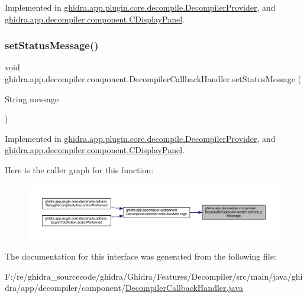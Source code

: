Implemented in \mbox{\hyperlink{classghidra_1_1app_1_1plugin_1_1core_1_1decompile_1_1_decompiler_provider_af5b6c269879799df67d4594c6df80434}{ghidra.\+app.\+plugin.\+core.\+decompile.\+Decompiler\+Provider}}, and \mbox{\hyperlink{classghidra_1_1app_1_1decompiler_1_1component_1_1_c_display_panel_ad50cdae31ae05e417f812e5855f33d2f}{ghidra.\+app.\+decompiler.\+component.\+C\+Display\+Panel}}.

\mbox{\label{interfaceghidra_1_1app_1_1decompiler_1_1component_1_1_decompiler_callback_handler_af7aab35a0989733d8f7731a18aa4ea52}} 
\subsubsection{\texorpdfstring{setStatusMessage()}{setStatusMessage()}}
{\footnotesize\ttfamily void ghidra.\+app.\+decompiler.\+component.\+Decompiler\+Callback\+Handler.\+set\+Status\+Message (\begin{DoxyParamCaption}\item[{String}]{message }\end{DoxyParamCaption})}



Implemented in \mbox{\hyperlink{classghidra_1_1app_1_1plugin_1_1core_1_1decompile_1_1_decompiler_provider_a729c019df8772c0ae39d1bce67b88ee5}{ghidra.\+app.\+plugin.\+core.\+decompile.\+Decompiler\+Provider}}, and \mbox{\hyperlink{classghidra_1_1app_1_1decompiler_1_1component_1_1_c_display_panel_a3949006ba655114ced3a014bfb35ed45}{ghidra.\+app.\+decompiler.\+component.\+C\+Display\+Panel}}.

Here is the caller graph for this function\+:
\nopagebreak
\begin{figure}[H]
\begin{center}
\leavevmode
\includegraphics[width=350pt]{interfaceghidra_1_1app_1_1decompiler_1_1component_1_1_decompiler_callback_handler_af7aab35a0989733d8f7731a18aa4ea52_icgraph}
\end{center}
\end{figure}


The documentation for this interface was generated from the following file\+:\begin{DoxyCompactItemize}
\item 
F\+:/re/ghidra\+\_\+sourcecode/ghidra/\+Ghidra/\+Features/\+Decompiler/src/main/java/ghidra/app/decompiler/component/\mbox{\hyperlink{_decompiler_callback_handler_8java}{Decompiler\+Callback\+Handler.\+java}}\end{DoxyCompactItemize}
